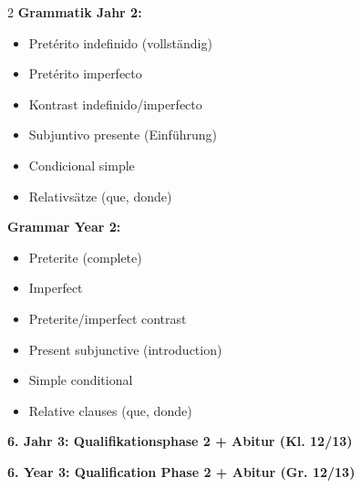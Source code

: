 \documentclass[10pt,a4paper]{article}
\newcommand{\secbil}[2]{%
\vspace{6pt}
\noindent\colorbox{spaet}{\parbox{0.48\textwidth}{\color{white}\bfseries\small #1}}%
\hfill%
\colorbox{english}{\parbox{0.48\textwidth}{\color{white}\bfseries\small #2}}
\vspace{3pt}
}
\begin{document}

\vspace{2mm}

\begin{paracol}{2}
\small
\textbf{Grammatik Jahr 2:}
\begin{itemize}[noitemsep,topsep=2pt]
\item Pretérito indefinido (vollständig)
\item Pretérito imperfecto
\item Kontrast indefinido/imperfecto
\item Subjuntivo presente (Einführung)
\item Condicional simple
\item Relativsätze (que, donde)
\end{itemize}

\switchcolumn

\small\color{english}
\textbf{Grammar Year 2:}
\begin{itemize}[noitemsep,topsep=2pt]
\item Preterite (complete)
\item Imperfect
\item Preterite/imperfect contrast
\item Present subjunctive (introduction)
\item Simple conditional
\item Relative clauses (que, donde)
\end{itemize}

\end{paracol}

\secbil{6. Jahr 3: Qualifikationsphase 2 + Abitur (Kl. 12/13)}{6. Year 3: Qualification Phase 2 + Abitur (Gr. 12/13)}
\end{document}
